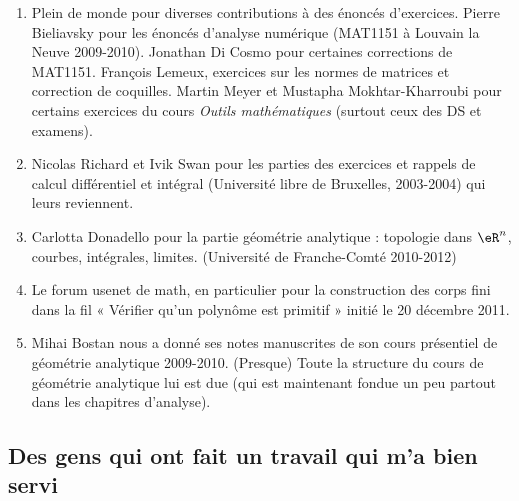 \begin{enumerate}
    \item
        Plein de monde pour diverses contributions à des énoncés d'exercices. Pierre Bieliavsky pour les énoncés d'analyse numérique (MAT1151 à Louvain la Neuve 2009-2010). Jonathan Di Cosmo pour certaines corrections de MAT1151. François Lemeux, exercices sur les normes de matrices et correction de coquilles.  Martin Meyer et Mustapha Mokhtar-Kharroubi pour certains exercices du cours \emph{Outils mathématiques} (surtout ceux des DS et examens).
    \item
               Nicolas Richard et Ivik Swan pour les parties des exercices et rappels de calcul différentiel et intégral (Université libre de Bruxelles, 2003-2004) qui leurs reviennent.
            \item
                Carlotta Donadello pour la partie géométrie analytique : topologie dans \( \eR^n\), courbes, intégrales, limites. (Université de Franche-Comté 2010-2012)
    \item
        Le forum usenet de math, en particulier pour la construction des corps fini dans la fil « Vérifier qu'un polynôme est primitif » initié le 20 décembre 2011.
    \item
        Mihai Bostan nous a donné ses notes manuscrites de son cours présentiel de géométrie analytique 2009-2010. (Presque) Toute la structure du cours de géométrie analytique lui est due (qui est maintenant fondue un peu partout dans les chapitres d'analyse).
\end{enumerate}

\subsection{Des gens qui ont fait un travail qui m'a bien servi}

